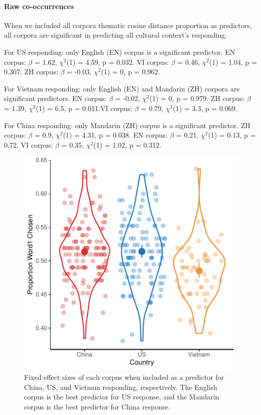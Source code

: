 \documentclass[10pt, letterpaper]{article}
\newenvironment{CodeChunk}{}{}
\begin{document}
\hypertarget{raw-co-occurrences}{%
\paragraph{Raw co-occurrences}\label{raw-co-occurrences}}

When we included all corpora thematic cosine distance proportion as
predictors, all corpora are significant in predicting all cultural
context's responding.

For US responding: only English (EN) corpus is a significant predictor.
EN corpus: \(\beta\) = 1.62, \(\chi^2\)(1) = 4.59, p = 0.032. VI corpus:
\(\beta\) = 0.46, \(\chi^2\)(1) = 1.04, p = 0.307. ZH corpus: \(\beta\)
= -0.03, \(\chi^2\)(1) = 0, p = 0.962.

For Vietnam responding: only English (EN) and Mandarin (ZH) corpora are
significant predictors. EN corpus: \(\beta\) = -0.02, \(\chi^2\)(1) = 0,
p = 0.979. ZH corpus: \(\beta\) = 1.39, \(\chi^2\)(1) = 6.5, p =
0.011.VI corpus: \(\beta\) = 0.79, \(\chi^2\)(1) = 3.3, p = 0.069.

For China responding: only Mandarin (ZH) corpus is a significant
predictor. ZH corpus: \(\beta\) = 0.9, \(\chi^2\)(1) = 4.31, p = 0.038.
EN corpus: \(\beta\) = 0.21, \(\chi^2\)(1) = 0.13, p = 0.72. VI corpus:
\(\beta\) = 0.35, \(\chi^2\)(1) = 1.02, p = 0.312.

\begin{CodeChunk}
\begin{figure}[tb]
\includegraphics{figs/unnamed-chunk-4-1} \caption[Fixed effect sizes of each corpus when included as a predictor for China, US, and Vietnam responding, respectively]{Fixed effect sizes of each corpus when included as a predictor for China, US, and Vietnam responding, respectively. The English corpus is the best predictor for US response, and the Mandarin corpus is the best predictor for China response.}\label{fig:unnamed-chunk-4}
\end{figure}
\end{CodeChunk}
\end{document}
